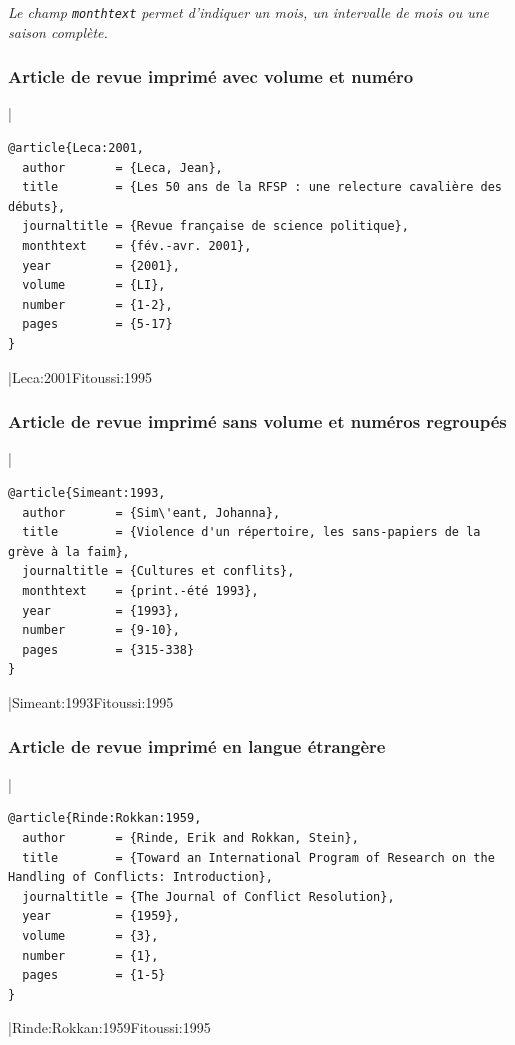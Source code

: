 \documentclass{article}
\begin{document}
\emph{Le champ \texttt{monthtext} permet d'indiquer un mois, un intervalle de mois ou une saison complète.}

\subsubsection{Article de revue imprimé avec volume et numéro}

|
\begin{verbatim}
@article{Leca:2001,
  author       = {Leca, Jean},
  title        = {Les 50 ans de la RFSP : une relecture cavalière des débuts},
  journaltitle = {Revue française de science politique},
  monthtext    = {fév.-avr. 2001},
  year         = {2001},
  volume       = {LI},
  number       = {1-2},
  pages        = {5-17}
}
\end{verbatim}
|{Leca:2001}{Fitoussi:1995}

\subsubsection{Article de revue imprimé sans volume et numéros regroupés}

|
\begin{verbatim}
@article{Simeant:1993,
  author       = {Sim\'eant, Johanna},
  title        = {Violence d'un répertoire, les sans-papiers de la grève à la faim},
  journaltitle = {Cultures et conflits},
  monthtext    = {print.-été 1993},
  year         = {1993},
  number       = {9-10},
  pages        = {315-338}
}
\end{verbatim}
|{Simeant:1993}{Fitoussi:1995}

\subsubsection{Article de revue imprimé en langue étrangère}

|
\begin{verbatim}
@article{Rinde:Rokkan:1959,
  author       = {Rinde, Erik and Rokkan, Stein},
  title        = {Toward an International Program of Research on the Handling of Conflicts: Introduction},
  journaltitle = {The Journal of Conflict Resolution},
  year         = {1959},
  volume       = {3},
  number       = {1},
  pages        = {1-5}
}
\end{verbatim}
|{Rinde:Rokkan:1959}{Fitoussi:1995}
\end{document}
